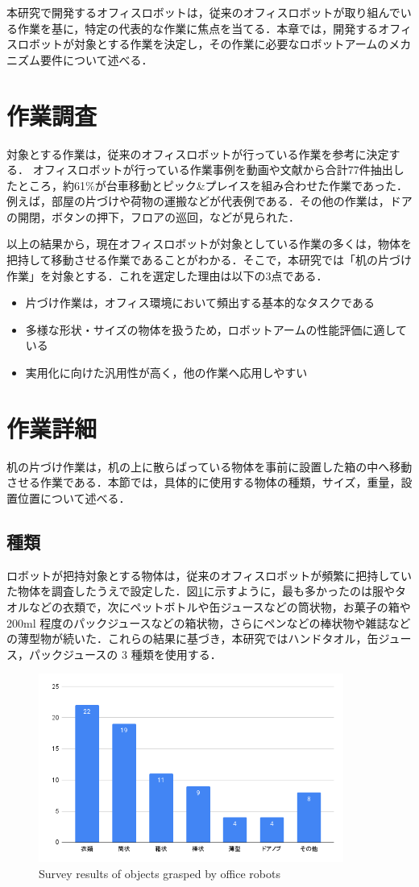 本研究で開発するオフィスロボットは，従来のオフィスロボットが取り組んでいる作業を基に，特定の代表的な作業に焦点を当てる．本章では，開発するオフィスロボットが対象とする作業を決定し，その作業に必要なロボットアームのメカニズム要件について述べる．
\section{作業調査}
対象とする作業は，従来のオフィスロボットが行っている作業を参考に決定する．
オフィスロボットが行っている作業事例を動画や文献から合計77件抽出したところ，約61\%が台車移動とピック\&プレイスを組み合わせた作業であった．例えば，部屋の片づけや荷物の運搬などが代表例である．その他の作業は，ドアの開閉，ボタンの押下，フロアの巡回，などが見られた．

以上の結果から，現在オフィスロボットが対象としている作業の多くは，物体を把持して移動させる作業であることがわかる．そこで，本研究では「机の片づけ作業」を対象とする．これを選定した理由は以下の3点である．
\begin{itemize}
  \item 片づけ作業は，オフィス環境において頻出する基本的なタスクである
  \item 多様な形状・サイズの物体を扱うため，ロボットアームの性能評価に適している
  \item 実用化に向けた汎用性が高く，他の作業へ応用しやすい
\end{itemize}

\section{作業詳細}
机の片づけ作業は，机の上に散らばっている物体を事前に設置した箱の中へ移動させる作業である．本節では，具体的に使用する物体の種類，サイズ，重量，設置位置について述べる．
\subsection{種類}
ロボットが把持対象とする物体は，従来のオフィスロボットが頻繁に把持していた物体を調査したうえで設定した．図\ref{fig:handget}に示すように，最も多かったのは服やタオルなどの衣類で，次にペットボトルや缶ジュースなどの筒状物，お菓子の箱や 200ml 程度のパックジュースなどの箱状物，さらにペンなどの棒状物や雑誌などの薄型物が続いた．これらの結果に基づき，本研究ではハンドタオル，缶ジュース，パックジュースの 3 種類を使用する．
\begin{figure}[h]
  \centering
  \includegraphics[width=10cm]{images/2syou/handget.png}
  \caption{Survey results of objects grasped by office robots}
  \label{fig:handget}
\end{figure}
\clearpage
